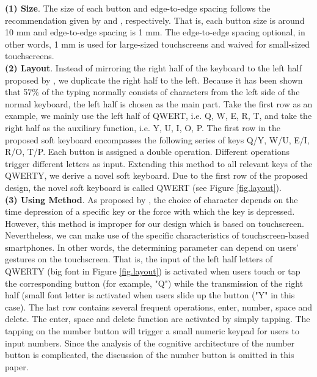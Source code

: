\documentclass{singlecol-new}
\theoremstyle{TH}{
\newtheorem{lemma}{Lemma}
\newtheorem{theorem}[lemma]{Theorem}
\newtheorem{corrolary}[lemma]{Corrolary}
\newtheorem{conjecture}[lemma]{Conjecture}
\newtheorem{proposition}[lemma]{Proposition}
\newtheorem{claim}[lemma]{Claim}
\newtheorem{stheorem}[lemma]{Wrong Theorem}
\newtheorem{algorithm}{Algorithm}
}
\theoremstyle{THrm}{
\newtheorem{definition}{Definition}[section]
\newtheorem{question}{Question}[section]
\newtheorem{remark}{Remark}
\newtheorem{scheme}{Scheme}
}
\theoremstyle{THhit}{
\newtheorem{case}{Case}[section]
}
\begin{document}
\textbf{(1)	Size}.
The size of each button and edge-to-edge spacing follows the recommendation given by \citet{park2010touch} and \citet{colle2004standing}, respectively. That is, each button size is around 10 mm and edge-to-edge spacing is 1 mm. The edge-to-edge spacing optional, in other words, 1 mm is used for large-sized touchscreens and waived for small-sized touchscreens. \\

\textbf{(2)	Layout}.
Instead of mirroring the right half of the keyboard to the left half proposed by \citet{matias1994half}, we duplicate the right half to the left. Because it has been shown that 57\% of the typing normally consists of characters from the left side of the normal keyboard, the left half is chosen as the main part. Take the first row as an example, we mainly use the left half of QWERT, i.e. Q, W, E, R, T, and take the right half as the auxiliary function, i.e. Y, U, I, O, P. The first row in the proposed soft keyboard encompasses the following series of keys Q/Y, W/U, E/I, R/O, T/P. Each button is assigned a double operation. Different operations trigger different letters as input. Extending this method to all relevant keys of the QWERTY, we derive a novel soft keyboard. Due to the first row of the proposed design, the novel soft keyboard is called QWERT (see Figure \ref{fig.layout}). \\

\textbf{(3)	Using Method}.
As proposed by \citet{matias1994half}, the choice of character depends on the time depression of a specific key or the force with which the key is depressed. However, this method is improper for our design which is based on touchscreen. Nevertheless, we can make use of the specific characteristics of touchscreen-based smartphones. In other words, the determining parameter can depend on users' gestures on the touchscreen. That is, the input of the left half letters of QWERTY (big font in Figure \ref{fig.layout}) is activated when users touch or tap the corresponding button (for example, "Q") while the transmission of the right half (small font letter is activated when users slide up the button ("Y" in this case). The last row contains several frequent operations, enter, number, space and delete. The enter, space and delete function are activated by simply tapping. The tapping on the number button will trigger a small  numeric keypad for users to input numbers. Since the analysis of the cognitive architecture of the number button is complicated, the discussion of the number button is omitted in this paper. \\
\end{document}
